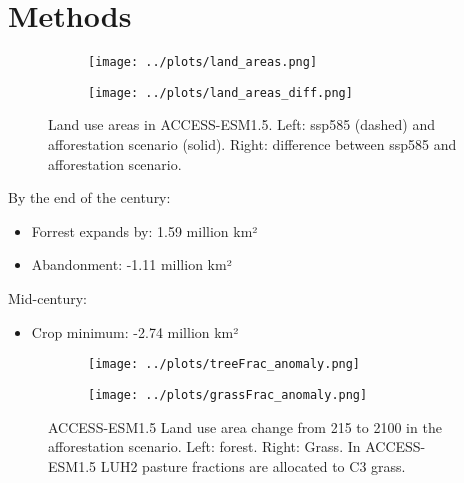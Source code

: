 \documentclass[]{article}
\begin{document}
\section{Methods}

\begin{figure}[H]
    \centering
    \begin{subfigure}[b]{0.45\linewidth}
        \texttt{[image: ../plots/land\_areas.png]}
    \end{subfigure}
    \begin{subfigure}[b]{0.45\linewidth}
        \texttt{[image: ../plots/land\_areas\_diff.png]}
    \end{subfigure}
    \caption{Land use areas in ACCESS-ESM1.5. Left: ssp585 (dashed) and afforestation scenario (solid). Right: difference between ssp585 and afforestation scenario.}
    \label{fig:land_use}
\end{figure}

By the end of the century:
\begin{itemize}
    \item Forrest expands by: 1.59 million km²
    \item Abandonment: -1.11 million km²
\end{itemize}
Mid-century:
\begin{itemize}
    \item Crop minimum: -2.74 million km²
\end{itemize}

\begin{figure}[H]
    \centering
    \begin{subfigure}[b]{0.45\linewidth}
        \texttt{[image: ../plots/treeFrac\_anomaly.png]}
    \end{subfigure}
    \begin{subfigure}[b]{0.45\linewidth}
        \texttt{[image: ../plots/grassFrac\_anomaly.png]}
    \end{subfigure}
    \caption{ACCESS-ESM1.5 Land use area change from 215 to 2100 in the afforestation scenario. Left: forest. Right: Grass. In ACCESS-ESM1.5 LUH2 pasture fractions are allocated to C3 grass.}
    \label{fig:land_use_map}
\end{figure}
\end{document}

